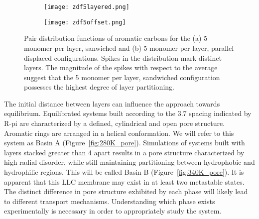 \begin{figure}[h]
	\centering
	\begin{subfigure}{0.45\textwidth}
		\centering
		\texttt{[image: zdf5layered.png]}
		\caption{}\label{fig:zdf_layered}
	\end{subfigure}
	\begin{subfigure}{0.45\textwidth}
		\centering
		\texttt{[image: zdf5offset.png]}
		\caption{}\label{fig:zdf_offset}
	\end{subfigure}
	\caption{Pair distribution functions of aromatic carbons for the
	(a) 5 monomer per layer, sanwiched and (b) 5 monomer per layer, 
	parallel displaced configurations. Spikes in the distribution mark
	distinct layers. The magnitude of the spikes with respect to the 
	average suggest that the 5 monomer per layer, sandwiched configuration
	possesses the highest degree of layer partitioning.}\label{fig:zdf}
\end{figure}

The initial distance between layers can influence the approach towards
equilibrium. Equilibrated systems built according to the 3.7 \angstrom 
spacing indicated by R-pi are characterized by a defined, cylindrical and
open pore structure. Aromatic rings are arranged in a helical conformation.
We will refer to this system as Basin A (Figure~\ref{fig:280K_pore}). Simulations
of systems built with layers stacked greater than 4 \angstrom apart results in a pore
structure characterized by high radial disorder, while still maintaining 
partitioning between hydrophobic and hydrophilic regions. This will be 
called Basin B (Figure~\ref{fig:340K_pore}). It is apparent that this LLC membrane
may exist in at least two metastable states. The distinct difference in 
pore structure exhibited by each phase will likely lead to different transport
mechanisms. Understanding which phase exists experimentally is necessary in 
order to appropriately study the system.

